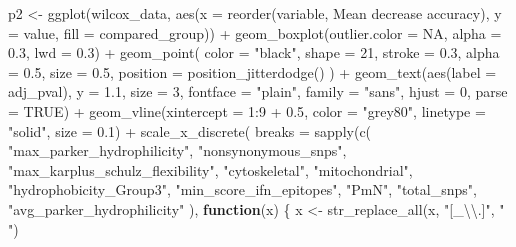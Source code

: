 \documentclass[
  11pt,
  oneside]{book}
\newenvironment{Shaded}{\begin{snugshade}}{\end{snugshade}}
\newcommand{\AttributeTok}[1]{\textcolor[rgb]{0.77,0.63,0.00}{#1}}
\newcommand{\ConstantTok}[1]{\textcolor[rgb]{0.00,0.00,0.00}{#1}}
\newcommand{\ControlFlowTok}[1]{\textcolor[rgb]{0.13,0.29,0.53}{\textbf{#1}}}
\newcommand{\DecValTok}[1]{\textcolor[rgb]{0.00,0.00,0.81}{#1}}
\newcommand{\FloatTok}[1]{\textcolor[rgb]{0.00,0.00,0.81}{#1}}
\newcommand{\FunctionTok}[1]{\textcolor[rgb]{0.00,0.00,0.00}{#1}}
\newcommand{\NormalTok}[1]{#1}
\newcommand{\OtherTok}[1]{\textcolor[rgb]{0.56,0.35,0.01}{#1}}
\newcommand{\SpecialCharTok}[1]{\textcolor[rgb]{0.00,0.00,0.00}{#1}}
\newcommand{\StringTok}[1]{\textcolor[rgb]{0.31,0.60,0.02}{#1}}
\begin{document}
\begin{Shaded}
\begin{Highlighting}[]
\NormalTok{p2 }\OtherTok{\textless{}{-}} \FunctionTok{ggplot}\NormalTok{(wilcox\_data, }\FunctionTok{aes}\NormalTok{(}\AttributeTok{x =} \FunctionTok{reorder}\NormalTok{(variable, }\StringTok{\textasciigrave{}}\AttributeTok{Mean decrease accuracy}\StringTok{\textasciigrave{}}\NormalTok{), }\AttributeTok{y =}\NormalTok{ value, }\AttributeTok{fill =}\NormalTok{ compared\_group)) }\SpecialCharTok{+}
  \FunctionTok{geom\_boxplot}\NormalTok{(}\AttributeTok{outlier.color =} \ConstantTok{NA}\NormalTok{, }\AttributeTok{alpha =} \FloatTok{0.3}\NormalTok{, }\AttributeTok{lwd =} \FloatTok{0.3}\NormalTok{) }\SpecialCharTok{+}
  \FunctionTok{geom\_point}\NormalTok{(}
    \AttributeTok{color =} \StringTok{"black"}\NormalTok{, }\AttributeTok{shape =} \DecValTok{21}\NormalTok{, }\AttributeTok{stroke =} \FloatTok{0.3}\NormalTok{, }\AttributeTok{alpha =} \FloatTok{0.5}\NormalTok{, }\AttributeTok{size =} \FloatTok{0.5}\NormalTok{,}
    \AttributeTok{position =} \FunctionTok{position\_jitterdodge}\NormalTok{()}
\NormalTok{  ) }\SpecialCharTok{+}
  \FunctionTok{geom\_text}\NormalTok{(}\FunctionTok{aes}\NormalTok{(}\AttributeTok{label =}\NormalTok{ adj\_pval), }\AttributeTok{y =} \FloatTok{1.1}\NormalTok{, }\AttributeTok{size =} \DecValTok{3}\NormalTok{, }\AttributeTok{fontface =} \StringTok{"plain"}\NormalTok{, }\AttributeTok{family =} \StringTok{"sans"}\NormalTok{, }\AttributeTok{hjust =} \DecValTok{0}\NormalTok{, }\AttributeTok{parse =} \ConstantTok{TRUE}\NormalTok{) }\SpecialCharTok{+}
  \FunctionTok{geom\_vline}\NormalTok{(}\AttributeTok{xintercept =} \DecValTok{1}\SpecialCharTok{:}\DecValTok{9} \SpecialCharTok{+} \FloatTok{0.5}\NormalTok{, }\AttributeTok{color =} \StringTok{"grey80"}\NormalTok{, }\AttributeTok{linetype =} \StringTok{"solid"}\NormalTok{, }\AttributeTok{size =} \FloatTok{0.1}\NormalTok{) }\SpecialCharTok{+}
  \FunctionTok{scale\_x\_discrete}\NormalTok{(}
    \AttributeTok{breaks =} \FunctionTok{sapply}\NormalTok{(}\FunctionTok{c}\NormalTok{(}
      \StringTok{"max\_parker\_hydrophilicity"}\NormalTok{,}
      \StringTok{"nonsynonymous\_snps"}\NormalTok{,}
      \StringTok{"max\_karplus\_schulz\_flexibility"}\NormalTok{,}
      \StringTok{"cytoskeletal"}\NormalTok{,}
      \StringTok{"mitochondrial"}\NormalTok{,}
      \StringTok{"hydrophobicity\_Group3"}\NormalTok{,}
      \StringTok{"min\_score\_ifn\_epitopes"}\NormalTok{,}
      \StringTok{"PmN"}\NormalTok{,}
      \StringTok{"total\_snps"}\NormalTok{,}
      \StringTok{"avg\_parker\_hydrophilicity"}
\NormalTok{    ), }\ControlFlowTok{function}\NormalTok{(x) \{}
\NormalTok{      x }\OtherTok{\textless{}{-}} \FunctionTok{str\_replace\_all}\NormalTok{(x, }\StringTok{"[\_}\SpecialCharTok{\textbackslash{}\textbackslash{}}\StringTok{.]"}\NormalTok{, }\StringTok{" "}\NormalTok{)}

\end{Highlighting}
\end{Shaded}
\end{document}
